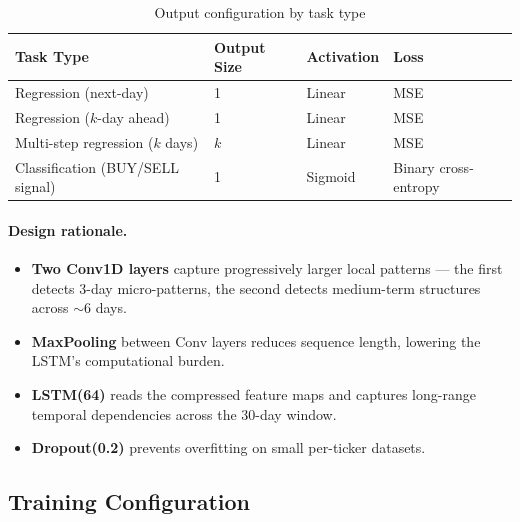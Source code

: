 \documentclass[12pt,a4paper]{article}
\begin{document}
\begin{table}[H]
\centering
\caption{Output configuration by task type}
\begin{tabular}{llll}
\toprule
\textbf{Task Type} & \textbf{Output Size} & \textbf{Activation} & \textbf{Loss} \\
\midrule
Regression (next-day)            & 1   & Linear  & MSE \\
Regression ($k$-day ahead)       & 1   & Linear  & MSE \\
Multi-step regression ($k$ days) & $k$ & Linear  & MSE \\
Classification (BUY/SELL signal) & 1   & Sigmoid & Binary cross-entropy \\
\bottomrule
\end{tabular}
\end{table}

\paragraph{Design rationale.}
\begin{itemize}[leftmargin=2em]
  \item \textbf{Two Conv1D layers} capture progressively larger local patterns
        --- the first detects 3-day micro-patterns, the second detects
        medium-term structures across $\sim$6 days.
  \item \textbf{MaxPooling} between Conv layers reduces sequence length, lowering
        the LSTM's computational burden.
  \item \textbf{LSTM(64)} reads the compressed feature maps and captures
        long-range temporal dependencies across the 30-day window.
  \item \textbf{Dropout(0.2)} prevents overfitting on small per-ticker datasets.
\end{itemize}

\subsection{Training Configuration}
\end{document}

